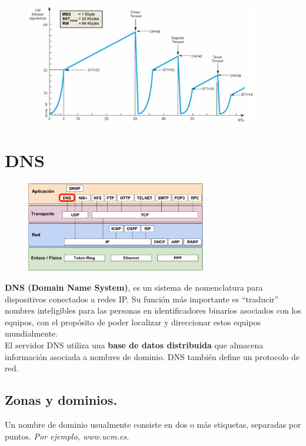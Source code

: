 \begin{itemize}
\begin{enumerate}
    \end{enumerate}
        \begin{figure}[H] \centering
        \includegraphics[width=0.9\textwidth]{img/TCP_congtimeout.png}\end{figure}
\end{itemize}

\section{DNS}
\begin{figure}[H]\centering\includegraphics[width=0.7\textwidth]{img/DNS.png}
\end{figure}
\textbf{DNS (Domain Name System)}, es un sistema de nomenclatura  para dispositivos conectados a redes IP. Su función más importante es \enquote{traducir} nombres inteligibles para las personas en identificadores binarios asociados con los equipos, con el propósito de poder localizar y direccionar estos equipos mundialmente.\\

El servidor DNS utiliza una \textbf{base de datos distribuida} que almacena información asociada a nombres de dominio. DNS también define un protocolo de red.

\subsection{Zonas y dominios.}
Un nombre de dominio usualmente consiste en dos o más etiquetas, separadas por puntos. \textit{Por ejemplo, www.ucm.es.}

